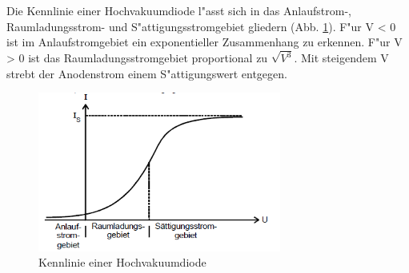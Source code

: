 Die Kennlinie einer Hochvakuumdiode l"asst sich in das Anlaufstrom-, Raumladungsstrom- und S"attigungsstromgebiet gliedern (Abb. \ref{kennlinie}).
F"ur V < 0 ist im Anlaufstromgebiet ein exponentieller Zusammenhang zu erkennen. F"ur V > 0 ist das Raumladungsstromgebiet proportional zu $\sqrt{V^3}$.
Mit steigendem V strebt der Anodenstrom einem S"attigungswert entgegen.

\begin{figure}[!h]
	\centering
	\includegraphics[width = 8cm]{img/kennlinie.PNG}
	\caption{Kennlinie einer Hochvakuumdiode}
	\label{kennlinie}
\end{figure}